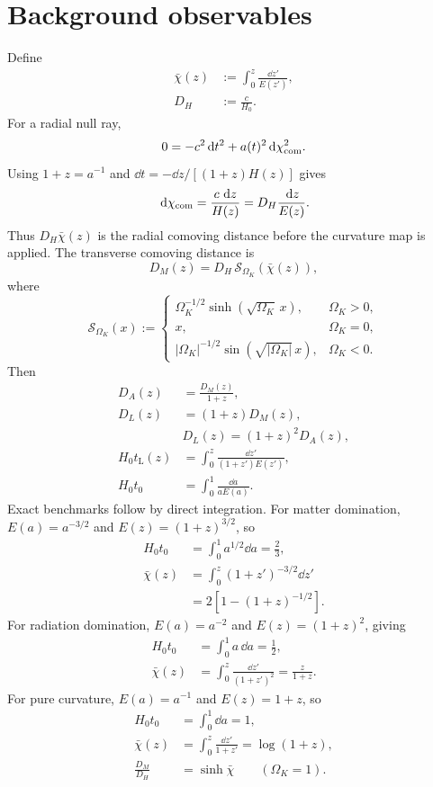 \section{Background observables}
Define
\begin{align}
\bar\chi(z)&:=\int_0^z\frac{\dd z'}{E(z')},\\
D_H&:=\frac{c}{H_0}.
\end{align}
For a radial null ray,
\begin{equation}
0=-c^2\,\mathrm d t^2+a(t)^2\,\mathrm d\chi_{\rm com}^2.
\end{equation}
Using \(1+z=a^{-1}\) and
\(\dd t=-\dd z/[(1+z)H(z)]\) gives
\begin{equation}
\,\mathrm d\chi_{\rm com}
=\frac{c\,\,\mathrm d z}{H(z)}
=D_H\frac{\,\mathrm d z}{E(z)}.
\end{equation}
Thus \(D_H\bar\chi(z)\) is the radial comoving distance before the curvature map is applied.
The transverse comoving distance is
\begin{equation}
D_M(z)=D_H\,\mathcal S_{\Omega_K}\!\left(\bar\chi(z)\right),
\end{equation}
where
\begin{equation}
\mathcal S_{\Omega_K}(x)
:=
\begin{cases}
\Omega_K^{-1/2}\sinh(\sqrt{\Omega_K}\,x),&\Omega_K>0,\\
x,&\Omega_K=0,\\
|\Omega_K|^{-1/2}\sin(\sqrt{|\Omega_K|}\,x),&\Omega_K<0.
\end{cases}
\end{equation}
Then
\begin{align}
D_A(z)&=\frac{D_M(z)}{1+z},\\
D_L(z)&=(1+z)D_M(z),\\
&\boxed{D_L(z)=(1+z)^2D_A(z)},\\
H_0t_{\mathrm L}(z)
&=\int_0^z\frac{\dd z'}{(1+z')E(z')},\\
H_0t_0
&=\int_0^1\frac{\dd a}{aE(a)}.
\end{align}
Exact benchmarks follow by direct integration.  For matter domination, \(E(a)=a^{-3/2}\) and \(E(z)=(1+z)^{3/2}\), so
\begin{align}
H_0t_0
&=\int_0^1a^{1/2}\dd a=\frac23,\\
\bar\chi(z)
&=\int_0^z(1+z')^{-3/2}\dd z'\\
&=2\left[1-(1+z)^{-1/2}\right].
\end{align}
For radiation domination, \(E(a)=a^{-2}\) and \(E(z)=(1+z)^2\), giving
\begin{align}
H_0t_0
&=\int_0^1a\,\dd a=\frac12,\\
\bar\chi(z)
&=\int_0^z\frac{\dd z'}{(1+z')^2}
=\frac{z}{1+z}.
\end{align}
For pure curvature, \(E(a)=a^{-1}\) and \(E(z)=1+z\), so
\begin{align}
H_0t_0
&=\int_0^1\dd a=1,\\
\bar\chi(z)
&=\int_0^z\frac{\dd z'}{1+z'}
=\log(1+z),\\
\frac{D_M}{D_H}&=\sinh\bar\chi
\qquad (\Omega_K=1).
\end{align}

